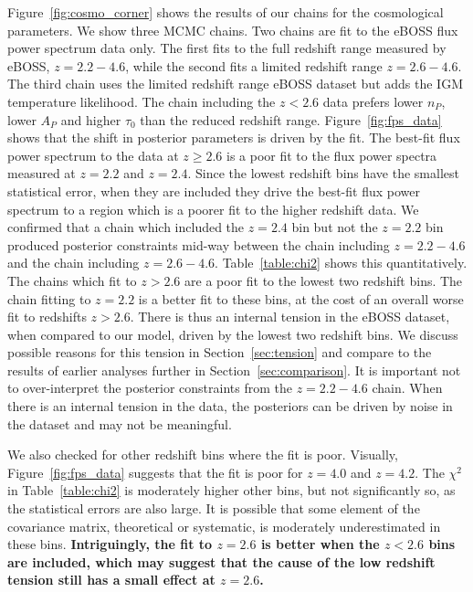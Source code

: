 Figure~\ref{fig:cosmo_corner} shows the results of our chains for the cosmological parameters.
We show three MCMC chains.
Two chains are fit to the eBOSS flux power spectrum data only.
The first fits to the full redshift range measured by eBOSS, $z=2.2 - 4.6$, while the second fits a limited redshift range $z=2.6 - 4.6$.
The third chain uses the limited redshift range eBOSS dataset but adds the IGM temperature likelihood.
The chain including the $z < 2.6$ data prefers lower $n_P$, lower $A_P$ and higher $\tau_0$ than the reduced redshift range.
Figure~\ref{fig:fps_data} shows that the shift in posterior parameters is driven by the fit.
The best-fit flux power spectrum to the data at $z \geq 2.6$ is a poor fit to the flux power spectra measured at $z=2.2$ and $z=2.4$.
Since the lowest redshift bins have the smallest statistical error, when they are included they drive the best-fit flux power spectrum to a region which is a poorer fit to the higher redshift data.
We confirmed that a chain which included the $z=2.4$ bin but not the $z=2.2$ bin produced posterior constraints mid-way between the chain including $z=2.2-4.6$ and the chain including $z=2.6-4.6$.
Table~\ref{table:chi2} shows this quantitatively.
The chains which fit to $z > 2.6$ are a poor fit to the lowest two redshift bins.
The chain fitting to $z=2.2$ is a better fit to these bins, at the cost of an overall worse fit to redshifts $z > 2.6$.
There is thus an internal tension in the eBOSS dataset, when compared to our model, driven by the lowest two redshift bins.
We discuss possible reasons for this tension in Section~\ref{sec:tension} and compare to the results of earlier analyses further in Section~\ref{sec:comparison}.
It is important not to over-interpret the posterior constraints from the $z=2.2-4.6$ chain.
When there is an internal tension in the data, the posteriors can be driven by noise in the dataset and may not be meaningful.

We also checked for other redshift bins where the fit is poor.
Visually, Figure~\ref{fig:fps_data} suggests that the fit is poor for $z=4.0$ and $z=4.2$.
The $\chi^2$ in Table~\ref{table:chi2} is moderately higher other bins, but not significantly so, as the statistical errors are also large.
It is possible that some element of the covariance matrix, theoretical or systematic, is moderately underestimated in these bins.
\textbf{Intriguingly, the fit to $z=2.6$ is better when the $z < 2.6$ bins are included, which may suggest that the cause of the low redshift tension still has a small effect at $z=2.6$.}

